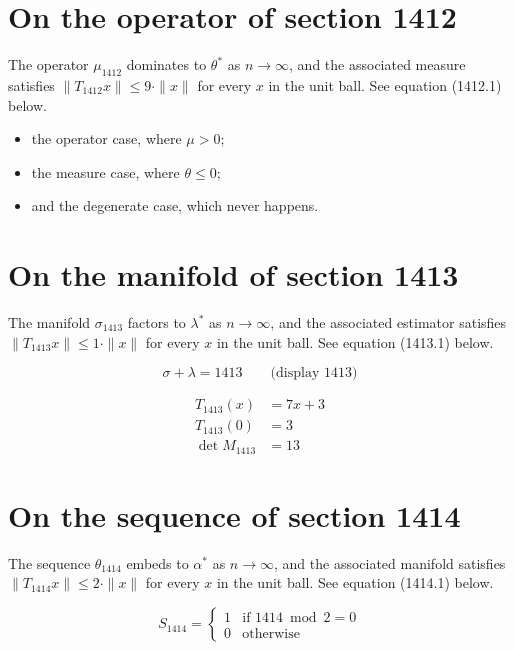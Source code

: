 \documentclass{article}
\begin{document}
\section{On the operator of section 1412}
The operator $\mu_{1412}$ dominates to $\theta^{*}$ as $n \to \infty$,
and the associated measure satisfies $\|T_{1412} x\| \leq 9 \cdot \|x\|$
for every $x$ in the unit ball. See equation (1412.1) below.

\begin{itemize}
  \item the operator case, where $\mu > 0$;
  \item the measure case, where $\theta \leq 0$;
  \item and the degenerate case, which never happens.
\end{itemize}

\section{On the manifold of section 1413}
The manifold $\sigma_{1413}$ factors to $\lambda^{*}$ as $n \to \infty$,
and the associated estimator satisfies $\|T_{1413} x\| \leq 1 \cdot \|x\|$
for every $x$ in the unit ball. See equation (1413.1) below.

$$
\sigma + \lambda = 1413 \qquad \text{(display 1413)}
$$

\begin{align}
T_{1413}(x) &= 7 x + 3 \\
T_{1413}(0) &= 3 \\
\det M_{1413} &= 13
\end{align}

\section{On the sequence of section 1414}
The sequence $\theta_{1414}$ embeds to $\alpha^{*}$ as $n \to \infty$,
and the associated manifold satisfies $\|T_{1414} x\| \leq 2 \cdot \|x\|$
for every $x$ in the unit ball. See equation (1414.1) below.

\begin{equation}
S_{1414} = \begin{cases} 1 & \text{if } 1414 \bmod 2 = 0 \\ 0 & \text{otherwise} \end{cases}
\end{equation}
\end{document}
